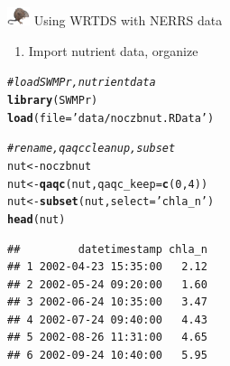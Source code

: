 \documentclass[xcolor=dvipsnames,serif]{beamer}\usepackage[]{graphicx}\usepackage[]{color}
\makeatletter
\newcommand{\hlnum}[1]{\textcolor[rgb]{0.686,0.059,0.569}{#1}}%
\newcommand{\hlstr}[1]{\textcolor[rgb]{0.192,0.494,0.8}{#1}}%
\newcommand{\hlcom}[1]{\textcolor[rgb]{0.678,0.584,0.686}{\textit{#1}}}%
\newcommand{\hlstd}[1]{\textcolor[rgb]{0.345,0.345,0.345}{#1}}%
\newcommand{\hlkwb}[1]{\textcolor[rgb]{0.69,0.353,0.396}{#1}}%
\newcommand{\hlkwc}[1]{\textcolor[rgb]{0.333,0.667,0.333}{#1}}%
\newcommand{\hlkwd}[1]{\textcolor[rgb]{0.737,0.353,0.396}{\textbf{#1}}}%
\newenvironment{kframe}{%
 \def\at@end@of@kframe{}%
 \ifinner\ifhmode%
  \def\at@end@of@kframe{\end{minipage}}%
  \begin{minipage}{\columnwidth}%
 \fi\fi%
 \def\FrameCommand##1{\hskip\@totalleftmargin \hskip-\fboxsep
 \colorbox{shadecolor}{##1}\hskip-\fboxsep
     \hskip-\linewidth \hskip-\@totalleftmargin \hskip\columnwidth}%
 \MakeFramed {\advance\hsize-\width
   \@totalleftmargin\z@ \linewidth\hsize
   \@setminipage}}%
 {\par\unskip\endMakeFramed%
 \at@end@of@kframe}
\newenvironment{knitrout}{}{} %
\makeatother
\begin{document}
\begin{frame}[t, fragile]{\includegraphics[width = 0.05\textwidth]{imgs/swmprat.png} Using WRTDS with NERRS data}{}
\begin{enumerate}
\item<1-> Import nutrient data, organize
\end{enumerate}
\begin{knitrout}\scriptsize
{}\color{fgcolor}\begin{kframe}
\begin{alltt}
\hlcom{# load SWMPr, nutrient data}
\hlkwd{library}\hlstd{(SWMPr)}
\hlkwd{load}\hlstd{(}\hlkwc{file} \hlstd{=} \hlstr{'data/noczbnut.RData'}\hlstd{)}

\hlcom{# rename, qaqc clean up, subset}
\hlstd{nut} \hlkwb{<-} \hlstd{noczbnut}
\hlstd{nut} \hlkwb{<-} \hlkwd{qaqc}\hlstd{(nut,} \hlkwc{qaqc_keep} \hlstd{=} \hlkwd{c}\hlstd{(}\hlnum{0}\hlstd{,} \hlnum{4}\hlstd{))}
\hlstd{nut} \hlkwb{<-} \hlkwd{subset}\hlstd{(nut,} \hlkwc{select} \hlstd{=} \hlstr{'chla_n'}\hlstd{)}
\hlkwd{head}\hlstd{(nut)}
\end{alltt}
\begin{verbatim}
##         datetimestamp chla_n
## 1 2002-04-23 15:35:00   2.12
## 2 2002-05-24 09:20:00   1.60
## 3 2002-06-24 10:35:00   3.47
## 4 2002-07-24 09:40:00   4.43
## 5 2002-08-26 11:31:00   4.65
## 6 2002-09-24 10:40:00   5.95
\end{verbatim}
\end{kframe}
\end{knitrout}
\end{frame}
\end{document}
